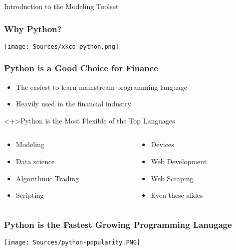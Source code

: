 \documentclass[handout, 11pt]{beamer}
\begin{document}
\begin{section}{Introduction to the Modeling Toolset}
\begin{frame}
\frametitle{Why Python?}
\begin{center}
\begin{adjustbox}{width=0.9\textwidth, height=0.8\textheight, keepaspectratio}
\texttt{[image: Sources/xkcd-python.png]}
\end{adjustbox}
\end{center}
\end{frame}
\begin{frame}
\frametitle{Python is a Good Choice for Finance}
\begin{itemize}
\item The easiest to learn mainstream programming language
\vfill
\item Heavily used in the financial industry
\end{itemize}
\vfill
\begin{block}<+>{Python is the Most Flexible of the Top Languages}
\begin{columns}
\begin{column}{0.45\textwidth}
\begin{itemize}
\item Modeling
\item Data science
\item Algorithmic Trading
\item Scripting
\end{itemize}
\end{column}
\begin{column}{0.45\textwidth}
\begin{itemize}
\item Devices
\item Web Development
\item Web Scraping
\item Even these slides
\end{itemize}
\end{column}
\end{columns}
\end{block}
\end{frame}
\begin{frame}
\frametitle{Python is the Fastest Growing Programming Lanugage}
\begin{center}
\begin{adjustbox}{width=0.9\textwidth, height=0.8\textheight, keepaspectratio}
\texttt{[image: Sources/python-popularity.PNG]}

\end{adjustbox}
\end{center}
\end{frame}
\end{section}
\end{document}
